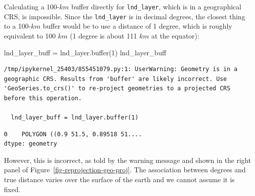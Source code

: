 \documentclass[
  letterpaper,
]{krantz}
\newenvironment{Shaded}{\begin{snugshade}}{\end{snugshade}}
\newcommand{\BuiltInTok}[1]{\textcolor[rgb]{0.00,0.23,0.31}{#1}}
\newcommand{\DecValTok}[1]{\textcolor[rgb]{0.68,0.00,0.00}{#1}}
\newcommand{\NormalTok}[1]{\textcolor[rgb]{0.00,0.23,0.31}{#1}}
\newcommand{\OperatorTok}[1]{\textcolor[rgb]{0.37,0.37,0.37}{#1}}
\begin{document}
Calculating a 100-\(km\) buffer directly for \texttt{lnd\_layer}, which
is in a geographical CRS, is impossible. Since the \texttt{lnd\_layer}
is in decimal degrees, the closest thing to a 100-\(km\) buffer would be
to use a distance of 1 degree, which is roughly equivalent to 100 \(km\)
(1 degree is about 111 \(km\) at the equator):

\begin{Shaded}
\begin{Highlighting}[]
\NormalTok{lnd\_layer\_buff }\OperatorTok{=}\NormalTok{ lnd\_layer.}\BuiltInTok{buffer}\NormalTok{(}\DecValTok{1}\NormalTok{)}
\NormalTok{lnd\_layer\_buff}
\end{Highlighting}
\end{Shaded}

\begin{verbatim}
/tmp/ipykernel_25403/855451079.py:1: UserWarning: Geometry is in a geographic CRS. Results from 'buffer' are likely incorrect. Use 'GeoSeries.to_crs()' to re-project geometries to a projected CRS before this operation.

  lnd_layer_buff = lnd_layer.buffer(1)
\end{verbatim}

\begin{verbatim}
0    POLYGON ((0.9 51.5, 0.89518 51....
dtype: geometry
\end{verbatim}

However, this is incorrect, as told by the warning message and shown in
the right panel of Figure~\ref{fig-reprojection-geo-proj}. The
association between degrees and true distance varies over the surface of
the earth and we cannot assume it is fixed.
\end{document}
